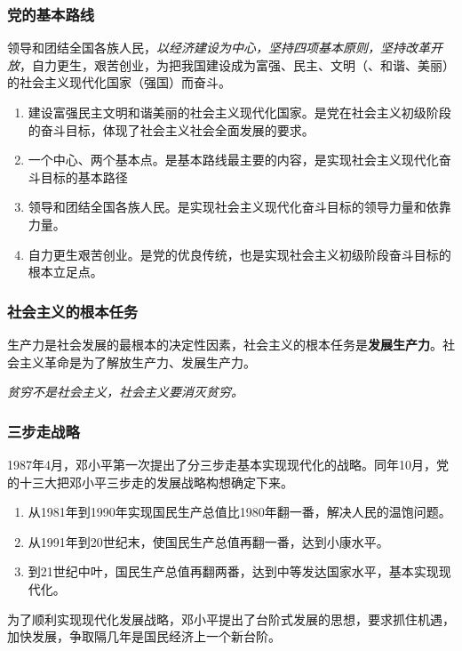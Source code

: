         \subsubsection{党的基本路线}
        领导和团结全国各族人民，\emph{以经济建设为中心，坚持四项基本原则，坚持改革开放}，自力更生，艰苦创业，为把我国建设成为富强、民主、文明（、和谐、美丽）的社会主义现代化国家（强国）而奋斗。
        \begin{enumerate}
            \item 建设富强民主文明和谐美丽的社会主义现代化国家。是党在社会主义初级阶段的奋斗目标，体现了社会主义社会全面发展的要求。
            \item 一个中心、两个基本点。是基本路线最主要的内容，是实现社会主义现代化奋斗目标的基本路径
            \item 领导和团结全国各族人民。是实现社会主义现代化奋斗目标的领导力量和依靠力量。
            \item 自力更生艰苦创业。是党的优良传统，也是实现社会主义初级阶段奋斗目标的根本立足点。
        \end{enumerate}

        \subsubsection{社会主义的根本任务}
        生产力是社会发展的最根本的决定性因素，社会主义的根本任务是\textbf{发展生产力}。社会主义革命是为了解放生产力、发展生产力。

        \emph{贫穷不是社会主义，社会主义要消灭贫穷。}

        \subsubsection{三步走战略}
        1987年4月，邓小平第一次提出了分三步走基本实现现代化的战略。同年10月，党的十三大把邓小平三步走的发展战略构想确定下来。
        \begin{enumerate}
            \item 从1981年到1990年实现国民生产总值比1980年翻一番，解决人民的温饱问题。
            \item 从1991年到20世纪末，使国民生产总值再翻一番，达到小康水平。
            \item 到21世纪中叶，国民生产总值再翻两番，达到中等发达国家水平，基本实现现代化。
        \end{enumerate}

        为了顺利实现现代化发展战略，邓小平提出了台阶式发展的思想，要求抓住机遇，加快发展，争取隔几年是国民经济上一个新台阶。

